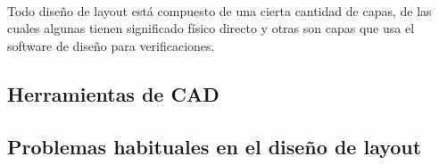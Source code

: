 \paragraph{}
Todo diseño de layout está compuesto de una cierta cantidad de capas, de las cuales
algunas tienen significado físico directo y otras son capas que usa el software de
diseño para verificaciones.

\subsection{Herramientas de CAD}

\subsection{Problemas habituales en el diseño de layout}
